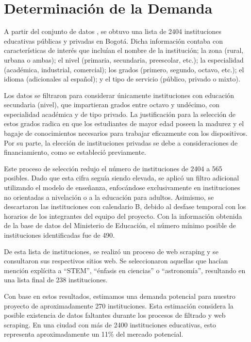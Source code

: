 \section{Determinación de la Demanda}%
\label{sec:Determinación de la Demanda}

A partir del conjunto de datos \cite{Nacional2016}, se obtuvo una lista de 2404
instituciones educativas públicas y privadas en Bogotá.
Dicha información contaba con características de interés que incluían el nombre
de la institución; la zona (rural, urbana o ambas);
el nivel (primaria, secundaria, preescolar, etc.); la especialidad
(académica, industrial, comercial); los grados (primero, segundo, octavo,
etc.); el idioma (adicionales al español); y el tipo de servicio (público,
privado o mixto).

Los datos se filtraron para considerar únicamente instituciones con educación
secundaria (nivel), que impartieran grados entre octavo y undécimo, con
especialidad académica y de tipo privado.
La justificación para la selección de estos grados radica en que los
estudiantes de mayor edad poseen la madurez y el bagaje de conocimientos
necesarios para trabajar eficazmente con los dispositivos.
Por su parte, la elección de instituciones privadas se debe a consideraciones
de financiamiento, como se estableció previamente.

Este proceso de selección redujo el número de instituciones de 2404 a 565
posibles.
Dado que esta cifra seguía siendo elevada, se aplicó un filtro adicional
utilizando el modelo de enseñanza, enfocándose exclusivamente en instituciones
no orientadas a nivelación o a la educación para adultos.
Asimismo, se descartaron las instituciones con calendario B, debido al desfase
temporal con los horarios de los integrantes del equipo del proyecto.
Con la información obtenida de la base de datos del Ministerio de Educación,
el número mínimo posible de instituciones identificadas fue de 490.

De esta lista de instituciones, se realizó un proceso de web scraping y se
consultaron sus respectivos sitios web.
Se seleccionaron aquellas que hacían mención explícita a ``STEM'', ``énfasis en
ciencias'' o ``astronomía'', resultando en una lista final de 238 instituciones.

Con base en estos resultados, estimamos una demanda potencial para nuestro
proyecto de aproximadamente 270 instituciones.
Esta estimación considera la posible existencia de datos faltantes durante los
procesos de filtrado y web scraping.
En una ciudad con más de 2400 instituciones educativas, esto representa
aproximadamente un 11\% del mercado potencial.

